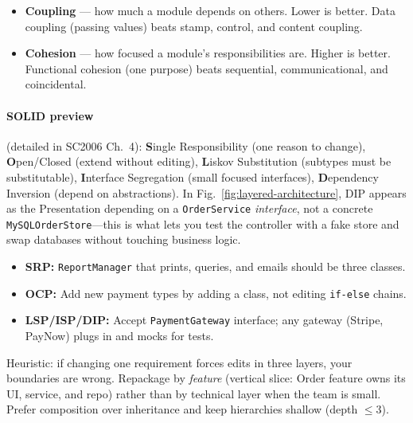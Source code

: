 \begin{itemize}
    \item \textbf{Coupling} --- how much a module depends on others. Lower is better. Data coupling (passing values) beats stamp, control, and content coupling.
    \item \textbf{Cohesion} --- how focused a module's responsibilities are. Higher is better. Functional cohesion (one purpose) beats sequential, communicational, and coincidental.
\end{itemize}

\paragraph{SOLID preview} (detailed in SC2006 Ch.~4): \textbf{S}ingle Responsibility (one reason to change), \textbf{O}pen/Closed (extend without editing), \textbf{L}iskov Substitution (subtypes must be substitutable), \textbf{I}nterface Segregation (small focused interfaces), \textbf{D}ependency Inversion (depend on abstractions). In Fig.~\ref{fig:layered-architecture}, DIP appears as the Presentation depending on a \texttt{OrderService} \emph{interface}, not a concrete \texttt{MySQLOrderStore}---this is what lets you test the controller with a fake store and swap databases without touching business logic.

\begin{itemize}
    \item \textbf{SRP:} \texttt{ReportManager} that prints, queries, and emails should be three classes.
    \item \textbf{OCP:} Add new payment types by adding a class, not editing \texttt{if-else} chains.
    \item \textbf{LSP/ISP/DIP:} Accept \texttt{PaymentGateway} interface; any gateway (Stripe, PayNow) plugs in and mocks for tests.
\end{itemize}

\begin{remark}
Heuristic: if changing one requirement forces edits in three layers, your boundaries are wrong. Repackage by \emph{feature} (vertical slice: Order feature owns its UI, service, and repo) rather than by technical layer when the team is small. Prefer composition over inheritance and keep hierarchies shallow (depth $\le 3$).
\end{remark}

